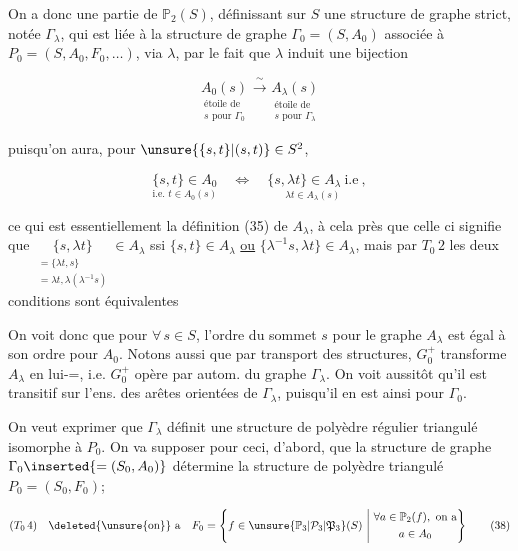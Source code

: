 On a donc  une  partie de $\mathbb P_2(S)$, définissant sur $S$ une structure de graphe strict, notée $\Gamma_\lambda$, qui est liée à la structure de graphe $\Gamma_0=(S,A_0)$ associée à  $P_0=(S,A_0,F_0,\ldots)$, via $\lambda$, par le fait que $\lambda$ induit une bijection

\[
\underset{\substack{\text{étoile de}\\s\text{ pour }\Gamma_0}}{A_0(s)}
 \xrightarrow{\ \sim\ }
\underset{\substack{\text{étoile de}\\s\text{ pour }\Gamma_\lambda}}{A_\lambda(s)}
\tag*{$(36)$}
\]

puisqu'on aura, pour $\unsure{\{s,t\}|(s,t)}\in S^2$, \unsure{)}

\[
\underset{\text{i.e. }t\in A_0(s)}{\{s,t\}\in A_0}\quad\Longleftrightarrow\quad
\underset{\lambda t\in A_\lambda(s)}{\{s,\lambda t\}\in A_\lambda\ \text{i.e}}\ ,
\tag*{$(37)$}
\]

ce qui est essentiellement la définition (35) de $A_\lambda$, à cela près que celle ci signifie que $\underset{\substack{=\{\lambda t,s\}\\=\lambda t,\lambda(\lambda^{-1}s)}}{\{s,\lambda t\}}\in A_\lambda$ ssi  \unsure{--} $\{s,t\}\in A_\lambda$ \uline{ou} $\{\lambda^{-1}s,\lambda t\}\in A_\lambda$, mais par $T_0\,2$ les deux conditions sont équivalentes

On voit donc que pour $\forall\,s\in S$, l'ordre du  sommet $s$ pour le graphe $A_\lambda$ est  égal à son ordre  pour $A_0$. Notons aussi que par transport des structures, $G_0^+$  transforme $A_\lambda$ en lui-=, i.e. $G_0^+$ opère par autom. du graphe $\Gamma_\lambda$.   On voit aussitôt qu'il est  transitif sur l'ens. des arêtes orientées de $\Gamma_\lambda$, puisqu'il en est ainsi pour $\Gamma_0$.

On veut exprimer que $\Gamma_\lambda$ définit une structure de polyèdre régulier triangulé isomorphe à $P_0$. On va supposer pour ceci, d'abord, que la structure de graphe $\Gamma_0\inserted{=(S_0,A_0)}$ détermine la structure de polyèdre triangulé $P_0=(S_0,F_0)$; 

\[
(T_0\,4)\quad \deleted{\unsure{\text{on}}}\ \text{a}\quad F_0=\left\{f\in\unsure{\mathbb P_3|\mathcal P_3|\mathfrak P_3}(S)\ \middle|\ 
 \begin{gathered}\forall a\in\mathbb P_2(f),\ \text{on a}\\a\in A_0\end{gathered}\right\}
\tag*{$(38)$}
\]

